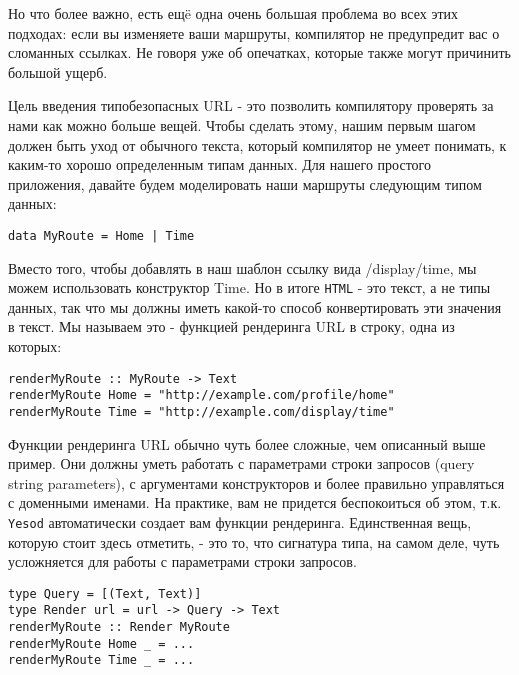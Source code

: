 Но что более важно, есть ещë одна очень большая проблема во всех этих подходах:
если вы изменяете ваши маршруты, компилятор не предупредит вас о сломанных
ссылках. Не говоря уже об опечатках, которые также могут причинить большой ущерб.

Цель введения типобезопасных URL - это позволить компилятору проверять за 
нами как можно больше вещей. Чтобы сделать этому, нашим первым шагом 
должен быть уход от обычного текста, который компилятор не умеет понимать, 
к каким-то хорошо определенным типам данных. Для нашего простого приложения,
давайте будем моделировать наши маршруты следующим типом данных:

\begin{lstlisting}
data MyRoute = Home | Time
\end{lstlisting}

Вместо того, чтобы добавлять в наш шаблон ссылку вида /display/time, мы можем
использовать конструктор Time. Но в итоге \texttt{HTML} - это текст, а не типы данных,
так что мы должны иметь какой-то способ конвертировать эти значения в текст.
Мы называем это - функцией рендеринга URL в строку, одна из которых:

\begin{lstlisting}
renderMyRoute :: MyRoute -> Text
renderMyRoute Home = "http://example.com/profile/home"
renderMyRoute Time = "http://example.com/display/time"
\end{lstlisting}

\begin{remark}
Функции рендеринга URL обычно чуть более сложные, чем описанный выше пример.
Они должны уметь работать с параметрами строки запросов (query string parameters),
с аргументами конструкторов и более правильно управляться с доменными именами.
На практике, вам не придется беспокоиться об этом, т.к. \texttt{Yesod} автоматически 
создает вам функции рендеринга. Единственная вещь, которую стоит здесь отметить,
 - это то, что сигнатура типа, на самом деле, чуть усложняется для 
работы с параметрами строки запросов.

\begin{lstlisting}
type Query = [(Text, Text)]                                                     
type Render url = url -> Query -> Text                                          
renderMyRoute :: Render MyRoute                                                 
renderMyRoute Home _ = ...                                                      
renderMyRoute Time _ = ...   
\end{lstlisting}
\end{remark}

